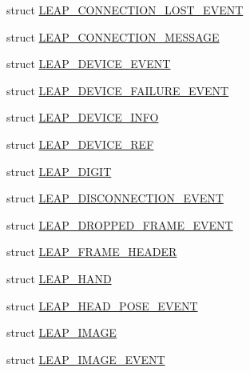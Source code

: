 \begin{DoxyCompactItemize}
\item 
struct \mbox{\hyperlink{struct_leap_internal_1_1_l_e_a_p___c_o_n_n_e_c_t_i_o_n___l_o_s_t___e_v_e_n_t}{L\+E\+A\+P\+\_\+\+C\+O\+N\+N\+E\+C\+T\+I\+O\+N\+\_\+\+L\+O\+S\+T\+\_\+\+E\+V\+E\+NT}}
\item 
struct \mbox{\hyperlink{struct_leap_internal_1_1_l_e_a_p___c_o_n_n_e_c_t_i_o_n___m_e_s_s_a_g_e}{L\+E\+A\+P\+\_\+\+C\+O\+N\+N\+E\+C\+T\+I\+O\+N\+\_\+\+M\+E\+S\+S\+A\+GE}}
\item 
struct \mbox{\hyperlink{struct_leap_internal_1_1_l_e_a_p___d_e_v_i_c_e___e_v_e_n_t}{L\+E\+A\+P\+\_\+\+D\+E\+V\+I\+C\+E\+\_\+\+E\+V\+E\+NT}}
\item 
struct \mbox{\hyperlink{struct_leap_internal_1_1_l_e_a_p___d_e_v_i_c_e___f_a_i_l_u_r_e___e_v_e_n_t}{L\+E\+A\+P\+\_\+\+D\+E\+V\+I\+C\+E\+\_\+\+F\+A\+I\+L\+U\+R\+E\+\_\+\+E\+V\+E\+NT}}
\item 
struct \mbox{\hyperlink{struct_leap_internal_1_1_l_e_a_p___d_e_v_i_c_e___i_n_f_o}{L\+E\+A\+P\+\_\+\+D\+E\+V\+I\+C\+E\+\_\+\+I\+N\+FO}}
\item 
struct \mbox{\hyperlink{struct_leap_internal_1_1_l_e_a_p___d_e_v_i_c_e___r_e_f}{L\+E\+A\+P\+\_\+\+D\+E\+V\+I\+C\+E\+\_\+\+R\+EF}}
\item 
struct \mbox{\hyperlink{struct_leap_internal_1_1_l_e_a_p___d_i_g_i_t}{L\+E\+A\+P\+\_\+\+D\+I\+G\+IT}}
\item 
struct \mbox{\hyperlink{struct_leap_internal_1_1_l_e_a_p___d_i_s_c_o_n_n_e_c_t_i_o_n___e_v_e_n_t}{L\+E\+A\+P\+\_\+\+D\+I\+S\+C\+O\+N\+N\+E\+C\+T\+I\+O\+N\+\_\+\+E\+V\+E\+NT}}
\item 
struct \mbox{\hyperlink{struct_leap_internal_1_1_l_e_a_p___d_r_o_p_p_e_d___f_r_a_m_e___e_v_e_n_t}{L\+E\+A\+P\+\_\+\+D\+R\+O\+P\+P\+E\+D\+\_\+\+F\+R\+A\+M\+E\+\_\+\+E\+V\+E\+NT}}
\item 
struct \mbox{\hyperlink{struct_leap_internal_1_1_l_e_a_p___f_r_a_m_e___h_e_a_d_e_r}{L\+E\+A\+P\+\_\+\+F\+R\+A\+M\+E\+\_\+\+H\+E\+A\+D\+ER}}
\item 
struct \mbox{\hyperlink{struct_leap_internal_1_1_l_e_a_p___h_a_n_d}{L\+E\+A\+P\+\_\+\+H\+A\+ND}}
\item 
struct \mbox{\hyperlink{struct_leap_internal_1_1_l_e_a_p___h_e_a_d___p_o_s_e___e_v_e_n_t}{L\+E\+A\+P\+\_\+\+H\+E\+A\+D\+\_\+\+P\+O\+S\+E\+\_\+\+E\+V\+E\+NT}}
\item 
struct \mbox{\hyperlink{struct_leap_internal_1_1_l_e_a_p___i_m_a_g_e}{L\+E\+A\+P\+\_\+\+I\+M\+A\+GE}}
\item 
struct \mbox{\hyperlink{struct_leap_internal_1_1_l_e_a_p___i_m_a_g_e___e_v_e_n_t}{L\+E\+A\+P\+\_\+\+I\+M\+A\+G\+E\+\_\+\+E\+V\+E\+NT}}

\end{DoxyCompactItemize}
